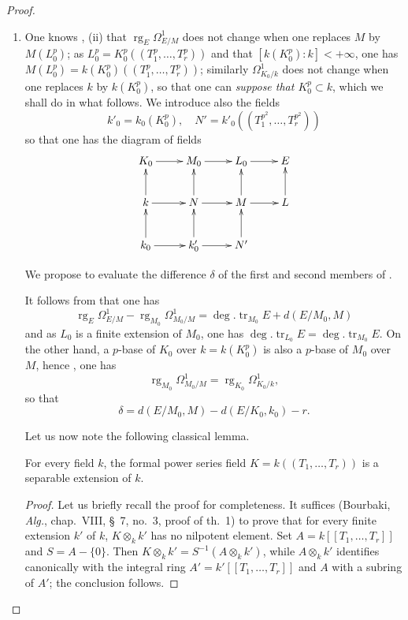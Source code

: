 \begin{proof}
\begin{enumerate}
  \item[(i)] One knows , (ii) that $\operatorname{rg}_E\Omega^1_{E/M}$ does not change when one replaces $M$ by $M(L_0^p)$; as $L_0^p=K_0^p((T_1^p,\ldots,T_r^p))$ and that $[k(K_0^p):k]<+\infty$, one has $M(L_0^p)=k(K_0^p)((T_1^p,\ldots,T_r^p))$;
  similarly $\Omega^1_{K_0/k}$ does not change when one replaces $k$ by $k(K_0^p)$, so that one can \emph{suppose that $K_0^p\subset k$}, which we shall do in what follows.
  We introduce also the fields
  \[
    k'_0=k_0(K_0^p),\quad N'=k'_0((T_1^{p^2},\ldots,T_r^{p^2}))
  \]
  so that one has the diagram of fields
  \[
    \xymatrix{
      K_0\ar[r] & M_0\ar[r] & L_0\ar[r] & E\\
      k\ar[u]\ar[r] & N\ar[u]\ar[r] & M\ar[u]\ar[r] & L\ar[u] \\
      k_0\ar[u]\ar[r] & k'_0\ar[u]\ar[r] & N'\ar[u] &
    }
  \]

  We propose to evaluate the difference $\delta$ of the first and second members of .

  It follows from  that one has
  \[
    \operatorname{rg}_E\Omega^1_{E/M}-\operatorname{rg}_{M_0}\Omega^1_{M_0/M}=\deg.\operatorname{tr}_{M_0}E+d(E/M_0,M)
  \]
  and as $L_0$ is a finite extension of $M_0$, one has $\deg.\operatorname{tr}_{L_0} E=\deg.\operatorname{tr}_{M_0} E$.
  On the other hand, a $p$-base of $K_0$ over $k=k(K_0^p)$ is also a $p$-base of $M_0$ over $M$, hence , one has
  \[
    \operatorname{rg}_{M_0}\Omega^1_{M_0/M}=\operatorname{rg}_{K_0}\Omega^1_{K_0/k},
  \]
  so that
  \begin{equation}
  \tag{21.9.6.3}
  \label{0.21.9.6.3}
    \delta=d(E/M_0,M)-d(E/K_0,k_0)-r.
  \end{equation}

  Let us now note the following classical lemma.

  \begin{lemma}[21.9.6.4]
  \label{0.21.9.6.4}
  For every field $k$, the formal power series field $K=k((T_1,\ldots,T_r))$ is a separable extension of $k$.
  \end{lemma}

  \begin{proof}
  Let us briefly recall the proof for completeness.
  It suffices (Bourbaki, \emph{Alg.}, chap.~VIII, \S~7, no.~3, proof of th.~1) to prove that for every finite extension $k'$ of $k$, $K\otimes_k k'$ has no nilpotent element.
  Set $A=k[[T_1,\ldots,T_r]]$ and $S=A-\{0\}$.
  Then $K\otimes_k k'=S^{-1}(A\otimes_k k')$, while $A\otimes_k k'$ identifies canonically with the integral ring $A'=k'[[T_1,\ldots,T_r]]$ and $A$ with a subring of $A'$; the conclusion follows.
  \end{proof}


\end{enumerate}
\end{proof}
